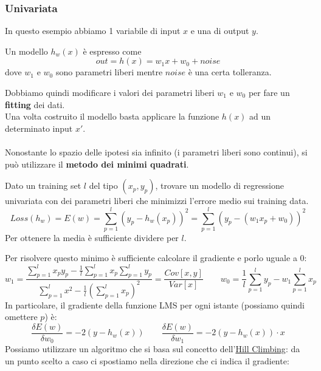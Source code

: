 \subsubsection{Univariata}
In questo esempio abbiamo 1 variabile di input $x$ e una di output $y$.
\begin{definition}[Modello]
	Un modello $h_w(x)$ è espresso come
	\begin{equation}
		out=h(x)=w_1x+w_0+noise
	\end{equation}
	dove $w_1$ e $w_0$ sono parametri liberi mentre $noise$ è una certa tolleranza.
\end{definition}
\noindent Dobbiamo quindi modificare i valori dei parametri liberi $w_1$ e $w_0$ per fare un \textbf{fitting} dei dati.\\
Una volta costruito il modello basta applicare la funzione $h(x)$ ad un determinato input $x'$.\\\\
Nonostante lo spazio delle ipotesi sia infinito (i parametri liberi sono continui), si può utilizzare il \textbf{metodo dei minimi quadrati}.
\begin{definition}[LMS]
	Dato un training set $l$ del tipo $(x_p,y_p)$, trovare un modello di regressione univariata con dei parametri liberi che minimizzi l'errore medio sui training data.
	\begin{equation*}
		Loss(h_w) = E(w) = \sum_{p=1}^{l} (y_p - h_w(x_p))^2 = \sum_{p=1}^{l} (y_p - (w_1 x_p + w_0))^2
	\end{equation*}
	Per ottenere la media è sufficiente dividere per $l$.
\end{definition}
\noindent Per risolvere questo minimo è sufficiente calcolare il gradiente e porlo uguale a $0$:
\begin{equation*}
	w_1 = \frac{\sum_{p=1}^{l} x_py_p - \frac{1}{l}\sum_{p=1}^{l} x_p\sum_{p=1}^{l} y_p}{\sum_{p=1}^{l} x^2 - \frac{1}{l}(\sum_{p=1}^{l} x_p)^2} = \frac{Cov[x,y]}{Var[x]} \quad\quad w_0=\frac{1}{l}\sum_{p=1}^{l} y_p - w_1 \sum_{p=1}^{l} x_p
\end{equation*}
In particolare, il gradiente della funzione LMS per ogni istante (possiamo quindi omettere $p$) è:
\begin{equation}
	\frac{\delta E(w)}{\delta w_0} = -2(y-h_w(x)) \quad\quad \frac{\delta E(w)}{\delta w_1} = -2(y-h_w(x))\cdot x
\end{equation}
Possiamo utilizzare un algoritmo che si basa sul concetto dell'\hyperref[alg:hill_climbing]{Hill Climbing}: da un punto scelto a caso ci spostiamo nella direzione che ci indica il gradiente:
